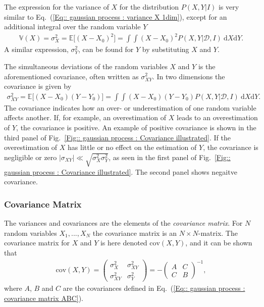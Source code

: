 \documentclass[twoside,english]{uiofysmaster}
\begin{document}
The expression for the variance of $X$ for the distribution $P(X,Y| I)$ is very similar to Eq.~(\ref{Eq:: gaussian process : variance X 1dim}), except for an additional integral over the random variable $Y$
\begin{align}
\mathbb{V}(X) = \sigma^2_X = \mathbb{E} \big[ (X-X_0)^2 \big] = \int \int (X-X_0)^2 P(X,Y | \mathcal{D}, I) ~\text{d}X\text{d}Y.
\end{align}
A similar expression, $\sigma_Y^2$, can be found for $Y$ by substituting $X$ and $Y$. 

The simultaneous deviations of the random variables $X$ and $Y$ is the aforementioned covariance, often written as $\sigma_{XY}^2$. In two dimensions the covariance is given by
\begin{align}
\sigma_{XY}^2 = \mathbb{E} \big[(X - X_0) (Y - Y_0) \big] =\int \int (X - X_0) (Y - Y_0) P (X, Y | \mathcal{D}, I) ~\text{d}X\text{d}Y.
\end{align}
The covariance indicates how an over- or underestimation of one random variable affects another. If, for example, an overestimation of $X$ leads to an overestimation of $Y$, the covariance is positive. An example of positive covariance is shown in the third panel of Fig.~\ref{Fig:: gaussian process : Covariance illustrated}. If the overestimation of $X$ has little or no effect on the estimation of $Y$, the covariance is negligible or zero $|\sigma_{XY}| \ll \sqrt{\sigma_X^2 \sigma_Y^2}$, as seen in the first panel of Fig.~\ref{Fig:: gaussian process : Covariance illustrated}. The second panel shows negaitve covariance.

\subsubsection{Covariance Matrix}

The variances and covariances are the elements of the \textit{covariance matrix}. For $N$ random variables $X_1, ...,X_N$ the covariance matrix is an $N \times N$-matrix. The covariance matrix for $X$ and $Y$ is here denoted $\text{cov}(X,Y)$, and it can be shown that \cite{sivia2006data}
\begin{align}
\text{cov}(X,Y) = 
\begin{pmatrix}
\sigma_X^2 & \sigma_{XY}^2\\
\sigma_{XY}^2 & \sigma_Y^2
\end{pmatrix}
= - \begin{pmatrix}
A & C\\
C & B
\end{pmatrix}^{-1},
\end{align}
where $A$, $B$ and $C$ are the covariances defined in Eq.~(\ref{Eq:: gaussian process : covariance matrix ABC}).
\end{document}
